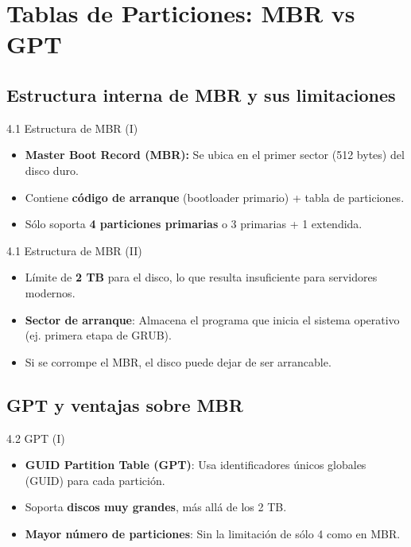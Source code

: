 \documentclass{beamer}
\begin{document}
\section{Tablas de Particiones: MBR vs GPT}

\subsection{Estructura interna de MBR y sus limitaciones}
\begin{frame}{4.1 Estructura de MBR (I)}
	\begin{itemize}
		\item \textbf{Master Boot Record (MBR):} Se ubica en el primer sector (512 bytes) del disco duro.
		\item Contiene \textbf{código de arranque} (bootloader primario) + tabla de particiones.
		\item Sólo soporta \textbf{4 particiones primarias} o 3 primarias + 1 extendida.
	\end{itemize}
\end{frame}

\begin{frame}{4.1 Estructura de MBR (II)}
	\begin{itemize}
		\item Límite de \textbf{2 TB} para el disco, lo que resulta insuficiente para servidores modernos.
		\item \textbf{Sector de arranque}: Almacena el programa que inicia el sistema operativo (ej. primera etapa de GRUB).
		\item Si se corrompe el MBR, el disco puede dejar de ser arrancable.
	\end{itemize}
\end{frame}

\subsection{GPT y ventajas sobre MBR}
\begin{frame}{4.2 GPT (I)}
	\begin{itemize}
		\item \textbf{GUID Partition Table (GPT)}: Usa identificadores únicos globales (GUID) para cada partición.
		\item Soporta \textbf{discos muy grandes}, más allá de los 2 TB.
		\item \textbf{Mayor número de particiones}: Sin la limitación de sólo 4 como en MBR.
	\end{itemize}
\end{frame}
\end{document}

